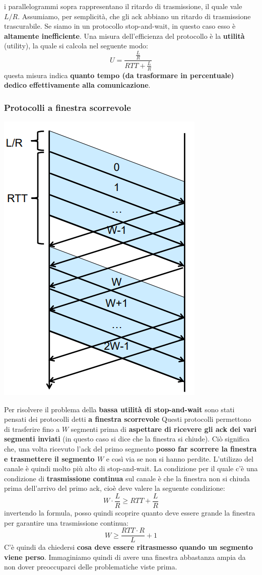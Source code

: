 \documentclass[12pt]{article}
\begin{document}
i parallelogrammi sopra rappresentano il ritardo di trasmissione, il quale vale $L/R$. Assumiamo, per semplicità, che gli ack
abbiano un ritardo di trasmissione trascurabile. Se siamo in un protocollo stop-and-wait, in questo caso esso è \textbf{altamente inefficiente}. Una
misura dell'efficienza del protocollo è la \textbf{utilità} (utility), la quale si calcola nel seguente modo:
$$U = \frac{\frac{L}{R}}{RTT + \frac{L}{R}}$$
questa misura indica \textbf{quanto tempo (da trasformare in percentuale) dedico effettivamente alla comunicazione}.
\subsubsection{Protocolli a finestra scorrevole}
\begin{center}
    \includegraphics[width = 0.30\linewidth]{Images/53.png}
\end{center}
Per risolvere il problema della \textbf{bassa utilità di stop-and-wait} sono stati pensati dei protocolli detti \textbf{a finestra scorrevole}
Questi protocolli permettono di trasferire fino a $W$ segmenti prima di \textbf{aspettare di ricevere gli ack dei vari segmenti inviati} (in questo caso si dice che la finestra si chiude).
Ciò significa che, una volta ricevuto l'ack del primo segmento \textbf{posso far scorrere la finestra e trasmettere il segmento $W$} e così via se non si hanno perdite. L'utilizzo del canale è quindi
molto più alto di stop-and-wait. La condizione per il quale c'è una condizione di \textbf{trasmissione continua} sul canale è che la finestra non si chiuda prima dell'arrivo del primo ack, cioè deve valere
la seguente condizione:
$$W \cdot \frac{L}{R} \geq RTT + \frac{L}{R}$$
invertendo la formula, posso quindi scoprire quanto deve essere grande la finestra per garantire una trasmissione continua:
$$W \geq \frac{RTT \cdot R}{L} + 1$$
C'è quindi da chiedersi \textbf{cosa deve essere ritrasmesso quando un segmento viene perso}.
Immaginiamo quindi di avere una finestra abbastanza ampia da non dover preoccuparci delle problematiche viste prima.
\end{document}
